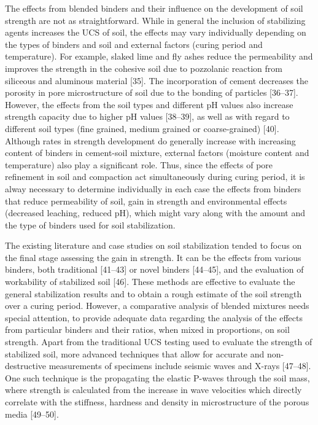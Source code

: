 \documentclass[electronics,article,submit,pdftex,moreauthors]{Definitions/mdpi}
\begin{document}
The effects from blended binders and their influence on the development of soil strength are not as straightforward. While in general the inclusion of stabilizing agents increases the UCS of soil, the effects may vary individually depending on the types of binders and soil and external factors (curing period and temperature). For example, slaked lime and fly ashes reduce the permeability and improves the strength in the cohesive soil due to pozzolanic reaction from siliceous and aluminous material [35]. The incorporation of cement decreases the porosity in pore microstructure of soil due to the bonding of particles [36–37]. However, the effects from the soil types and different pH values also increase strength capacity due to higher pH values [38–39], as well as with regard to different soil types (fine grained, medium grained or coarse-grained) [40]. Although rates in strength development do generally increase with increasing content of binders in cement-soil mixture, external factors (moisture content and temperature) also play a significant role. Thus, since the effects of pore refinement in soil and compaction act simultaneously during curing period, it is alway necessary to determine individually in each case the effects from binders that reduce permeability of soil, gain in strength and environmental effects (decreased leaching, reduced pH), which might vary along with the amount and the type of binders used for soil stabilization.

The existing literature and case studies on soil stabilization tended to focus on the final stage assessing the gain in strength. It can be the effects from various binders, both traditional [41–43] or novel binders [44–45], and the evaluation of workability of stabilized soil [46]. These methods are effective to evaluate the general stabilization results and to obtain a rough estimate of the soil strength over a curing period. However, a comparative analysis of blended mixtures needs special attention, to provide adequate data regarding the analysis of the effects from particular binders and their ratios, when mixed in proportions, on soil strength. Apart from the traditional UCS testing used to evaluate the strength of stabilized soil, more advanced techniques that allow for accurate and non-destructive measurements of specimens include seismic waves and X-rays [47–48]. One such technique is the propagating the elastic P-waves through the soil mass, where strength is calculated from the increase in wave velocities which directly correlate with the stiffness, hardness and density in microstructure of the porous media [49–50].
\end{document}
